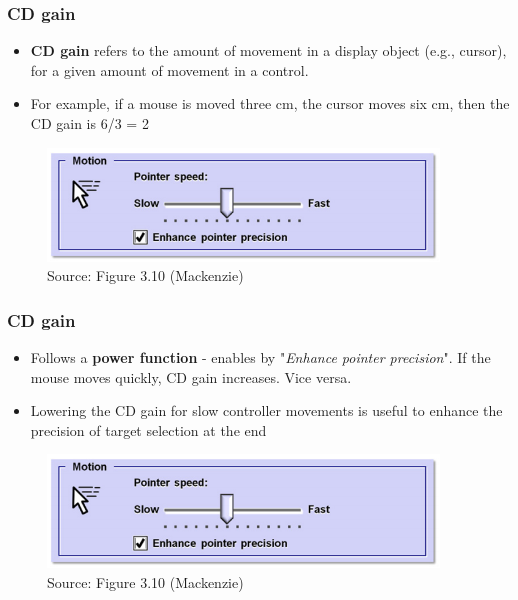 \documentclass{beamer}
\begin{document}
\begin{frame}
	\frametitle{CD gain}
	\begin{itemize}
		\item \textbf{CD gain} refers to the amount of movement in a display object (e.g., cursor), for a given amount of movement in a control. 
		\item For example,   if a mouse is moved three cm,  the cursor moves six cm, then the CD gain is 6/3 = 2
	\end{itemize}
	\begin{figure}
		\includegraphics[width=0.7\linewidth]{image/3-10}
		\caption{Source: Figure 3.10 (Mackenzie)}
	\end{figure}
\end{frame}

\begin{frame}
	\frametitle{CD gain}
	\begin{itemize}
		\item Follows a \textbf{power function} - enables by "\textit{Enhance pointer precision}".  If the mouse moves quickly, CD gain increases.  Vice versa.
		\item Lowering the CD gain for slow controller movements is useful to enhance the precision of target selection 
		at the end
	\end{itemize}
	\begin{figure}
		\includegraphics[width=0.7\linewidth]{image/3-10}
		\caption{Source: Figure 3.10 (Mackenzie)}
	\end{figure}
\end{frame}
\end{document}
